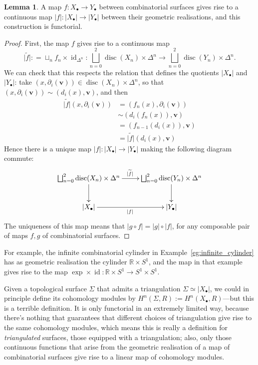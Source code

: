 \documentclass{tufte-handout}
\def\RR{\mathbb{R}}
\DeclareMathOperator{\disc}{disc}
\DeclareMathOperator{\id}{id}
\theoremstyle{definition}
\newtheorem{lemma}{Lemma}
\begin{document}
\begin{lemma}
A map $f\colon X_\bullet \to Y_\bullet$ between combinatorial surfaces gives rise to a continuous map 
$|f|\colon |X_\bullet| \to |Y_\bullet|$ between their geometric realisations, and this 
construction is functorial.
\end{lemma}

\begin{proof}
First, the map $f$ gives rise to a continuous map 
\[
	\widetilde{|f|}: = \sqcup_nf_n\times\id_{\Delta^n}\colon \bigsqcup_{n=0}^2 \disc(X_n)\times \Delta^n \to \bigsqcup_{n=0}^2 \disc(Y_n)\times \Delta^n.
\]
We can check that this respects the relation that defines the quotients $|X_\bullet|$ and 
$|Y_\bullet|$: take $(x,\partial_i(\mathbf{v})) \in \disc(X_n)\times \Delta^n$, so that
$(x,\partial_i(\mathbf{v})) \sim (d_i(x),\mathbf{v})$, and then 
\begin{align*}
\widetilde{|f|}(x,\partial_i(\mathbf{v})) & = (f_n(x),\partial_i(\mathbf{v})) \\
& \sim (d_i(f_n(x)),\mathbf{v})\\
& = (f_{n-1}(d_i(x)),\mathbf{v})\\
& = \widetilde{|f|}(d_i(x),\mathbf{v})
\end{align*}
Hence there is a unique map $|f|\colon |X_\bullet| \to |Y_\bullet|$ making the following diagram
commute:
\[
	\xymatrixnocompile{
		\bigsqcup_{n=0}^2 \disc(X_n)\times \Delta^n \ar[d]
			\ar[r]^{\widetilde{|f|}} &
			\bigsqcup_{n=0}^2 \disc(Y_n)\times \Delta^n \ar[d]\\
		|X_\bullet| \ar[r]_{|f|} & |Y_\bullet|
	}
\]
The uniqueness of this map means that $|g\circ f| = |g|\circ |f|$, for any composable pair of
maps $f,g$ of combinatorial surfaces.
\end{proof}

For example, the infinite combinatorial cylinder in Example~\ref{eg:infinite_cylinder} has as geometric 
realisation the cylinder $\RR \times S^1$, and the map in that example gives rise to the map
$\exp\times \id\colon \RR\times S^1 \to S^1\times S^1$.

Given a topological surface $\Sigma$ that admits a triangulation $\Sigma\simeq |X_\bullet|$,
we could in principle define its cohomology modules by $H^n(\Sigma,R) := H^n(X_\bullet,R)$---but
this is a terrible definition. It is only functorial in an extremely limited way, because 
there's nothing that guarantees that different choices of triangulation give rise to the 
same cohomology modules, which means this is really a definition for \emph{triangulated} surfaces, 
those equipped with a triangulation; also, only those continuous functions that arise from 
the geometric realisation of a map of combinatorial surfaces give rise
to a linear map of cohomology modules.
\end{document}
